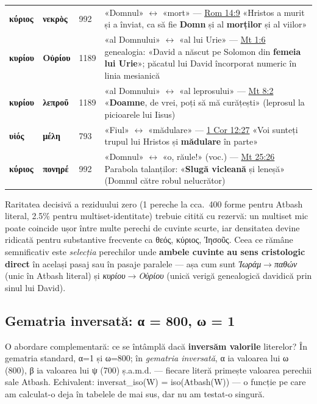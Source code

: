 \documentclass[12pt,a4paper,twoside,openany]{book}
\begin{document}
\begin{center}
\begin{tabular}{L{2.2cm}L{2.2cm}C{0.8cm}L{8cm}}
\textbf{κύριος} & \textbf{νεκρὸς} & 992 & «Domnul» $\leftrightarrow$ «mort» --- \href{https://bibliaortodoxa.ro/carte.php?id=52\&cap=14\#9}{Rom 14:9} «Hristos a murit și a înviat, ca să fie \textbf{Domn} și al \textbf{morților} și al viilor» \\
\textbf{κυρίου} & \textbf{Οὐρίου} & 1189 & «al Domnului» $\leftrightarrow$ «al lui Urie» --- \href{https://bibliaortodoxa.ro/carte.php?id=55\&cap=1\#6}{Mt 1:6} genealogia: «David a născut pe Solomon din \textbf{femeia lui Urie}»; păcatul lui David încorporat numeric în linia mesianică \\
\textbf{κυρίου} & \textbf{λεπροῦ} & 1189 & «al Domnului» $\leftrightarrow$ «al leprosului» --- \href{https://bibliaortodoxa.ro/carte.php?id=55\&cap=8\#2}{Mt 8:2} «\textbf{Doamne}, de vrei, poți să mă curățești» (leprosul la picioarele lui Iisus) \\
\textbf{υἱός} & \textbf{μέλη} & 793 & «Fiul» $\leftrightarrow$ «mădulare» --- \href{https://bibliaortodoxa.ro/carte.php?id=54\&cap=12\#27}{1 Cor 12:27} «Voi sunteți trupul lui Hristos și \textbf{mădulare} în parte» \\
\textbf{κύριος} & \textbf{πονηρέ} & 992 & «Domnul» $\leftrightarrow$ «o, răule!» (voc.) --- \href{https://bibliaortodoxa.ro/carte.php?id=55\&cap=25\#26}{Mt 25:26} Parabola talanților: «\textbf{Slugă vicleană} și leneșă» (Domnul către robul nelucrător) \\
\bottomrule
\end{tabular}
\end{center}

Raritatea decisivă a reziduului zero (1 pereche la cca.~400 forme pentru Atbash literal, 2.5\% pentru multiset-identitate) trebuie citită cu rezervă: un multiset mic poate coincide ușor între multe perechi de cuvinte scurte, iar densitatea devine ridicată pentru substantive frecvente ca θεός, κύριος, Ἰησοῦς. Ceea ce rămâne semnificativ este \textit{selecția} perechilor unde \textbf{ambele cuvinte au sens cristologic direct} în același pasaj sau în pasaje paralele --- așa cum sunt \textit{Ἰωράμ$\to$παθών} (unic în Atbash literal) și \textit{κυρίου$\to$Οὐρίου} (unică verigă genealogică davidică prin sinul lui David).

\subsection*{Gematria inversată: α = 800, ω = 1}\label{inverted-gematria}

O abordare complementară: ce se întâmplă dacă \textbf{inversăm valorile} literelor? În gematria standard, α=1 și ω=800; în \textit{gematria inversată}, α ia valoarea lui ω (800), β ia valoarea lui ψ (700) ș.a.m.d. --- fiecare literă primește valoarea perechii sale Atbash. Echivalent: inversat\_iso(W) = iso(Atbash(W)) --- o funcție pe care am calculat-o deja în tabelele de mai sus, dar nu am testat-o singură.
\end{document}
